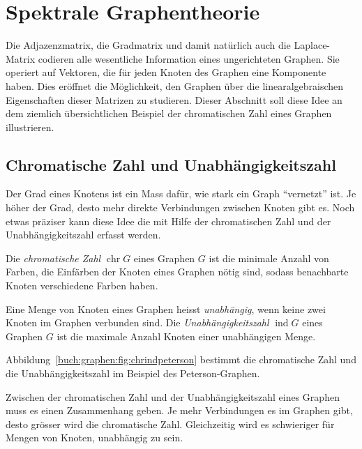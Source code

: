 %
%
%
\section{Spektrale Graphentheorie
\label{buch:section:spektrale-graphentheorie}}
Die Adjazenzmatrix, die Gradmatrix und damit natürlich auch
die Laplace-Matrix codieren alle wesentliche Information eines
ungerichteten Graphen.
Sie operiert auf Vektoren, die für jeden Knoten des Graphen eine
Komponente haben.
Dies eröffnet die Möglichkeit, den Graphen über die linearalgebraischen
Eigenschaften dieser Matrizen zu studieren.
Dieser Abschnitt soll diese Idee an dem ziemlich übersichtlichen Beispiel
der chromatischen Zahl eines Graphen illustrieren.

\subsection{Chromatische Zahl und Unabhängigkeitszahl
\label{buch:subsection:chromatische-zahl}}
Der Grad eines Knotens ist ein Mass dafür, wie stark ein Graph
``vernetzt'' ist.
Je höher der Grad, desto mehr direkte Verbindungen zwischen Knoten gibt es.
Noch etwas präziser kann diese Idee die mit Hilfe der 
chromatischen Zahl und der Unabhängigkeitszahl erfasst werden.

\begin{definition}
Die {\em chromatische Zahl} $\operatorname{chr}G$ eines Graphen $G$ ist
die minimale Anzahl von Farben, die Einfärben der Knoten eines Graphen
nötig sind, sodass benachbarte Knoten verschiedene Farben haben.
\end{definition}

\begin{definition}
Eine Menge von Knoten eines Graphen heisst {\em unabhängig}, wenn 
keine zwei Knoten im Graphen verbunden sind.
Die {\em Unabhängigkeitszahl} $\operatorname{ind}G$ eines Graphen $G$
ist die maximale Anzahl Knoten einer unabhängigen Menge.
\end{definition}

\begin{beispiel}
Abbildung~\ref{buch:graphen:fig:chrindpeterson} bestimmt die chromatische
Zahl und die Unabhängigkeitszahl im Beispiel des Peterson-Graphen.
\end{beispiel}

Zwischen der chromatischen Zahl und der Unabhängigkeitszahl eines Graphen
muss es einen Zusammenhang geben.
Je mehr Verbindungen es im Graphen gibt, desto grösser wird die chromatische
Zahl.
Gleichzeitig wird es schwieriger für Mengen von Knoten, unabhängig zu sein.

